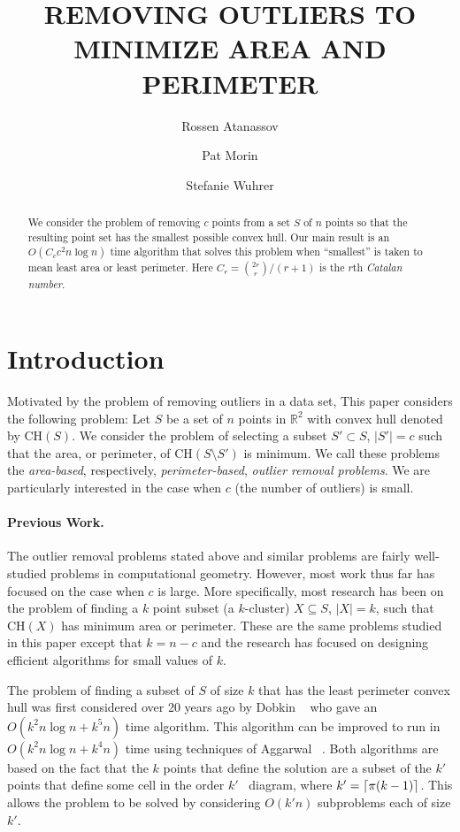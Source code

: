 \documentclass[lotsofwhite]{patmorin}
\title{\MakeUppercase{Removing Outliers to Minimize Area and Perimeter}}
\author{Rossen Atanassov \and
	Pat Morin \and
	Stefanie Wuhrer}
\date{}
\newcommand{\ch}{\mathrm{CH}}
\newcommand{\ntypes}{C_c}
\newcommand{\timepertype}{c^2 n\log n}
\newcommand{\runtime}{\ntypes \timepertype}
\begin{document}
\maketitle

\begin{abstract}
We consider the problem of removing $c$ points from a set $S$ of $n$
points so that the resulting point set has the smallest possible
convex hull.  Our main result is an $O(\runtime)$ time algorithm
that solves this problem when ``smallest'' is taken to mean least area
or least perimeter. Here $C_r = {2r\choose r}/(r+1)$ is
the $r$th \emph{Catalan number}.  
\end{abstract}

\section{Introduction}

Motivated by the problem of removing outliers in a data set, This
paper considers the following problem: Let $S$ be a set of $n$ points
in $\mathbb{R}^2$ with convex hull denoted by $\ch(S)$.  We consider
the problem of selecting a subset $S'\subset S$, $|S'|=c$ such that
the area, or perimeter, of $\ch(S\setminus S')$ is minimum.  We call
these problems the \emph{area-based}, respectively,
\emph{perimeter-based}, \emph{outlier removal problems}.  We are
particularly interested in the case when $c$ (the number of outliers)
is small.

\paragraph{Previous Work.} The outlier removal problems stated above
and similar problems are fairly well-studied problems in computational
geometry.  However, most work thus far has focused on the case when
$c$ is large. More specifically, most research has been on the problem
of finding a $k$ point subset (a $k$-cluster) $X\subseteq S$, $|X|=k$,
such that $\ch(X)$ has minimum area or perimeter. These are the same
problems studied in this paper except that $k=n-c$ and the research
has focused on designing efficient algorithms for small values of $k$.  

The problem of finding a subset of $S$ of size $k$ that has the least
perimeter convex hull was first considered over 20 years ago by Dobkin
\etal\ \cite{ddg83} who gave an $O(k^2n\log n + k^5 n)$ time
algorithm.  This algorithm can be improved to run in $O(k^2 n\log n +
k^4 n)$ time using techniques of Aggarwal \etal\ \cite{aiks89}.  Both
algorithms are based on the fact that the $k$ points that define the
solution are a subset of the $k'$ points that define some cell in the
order $k'$ \voronoi\ diagram, where $k'=\left\lceil \pi (k-1) \right\rceil$.  This
allows the problem to be solved by considering $O(k'n)$ subproblems
each of size $k'$.
\end{document}
